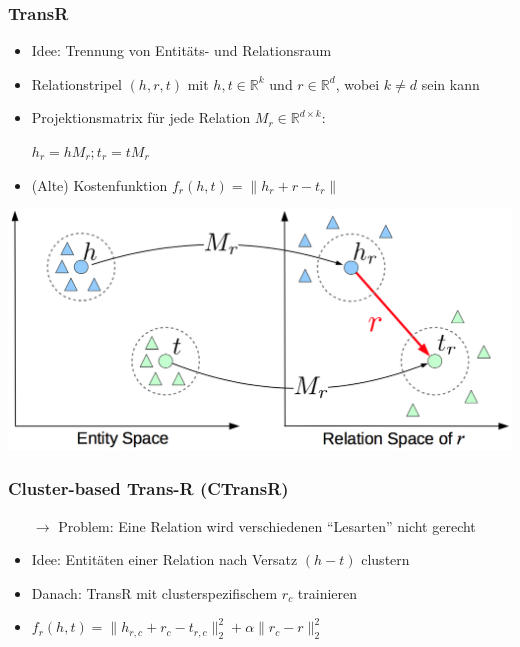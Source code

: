 \documentclass[10pt,xcolor={usenames,dvipsnames,svgnames,table}]{beamer}
\begin{document}
\begin{frame}
	\frametitle{TransR}
	\begin{itemize}
		\item Idee: Trennung von Entitäts- und Relationsraum
		\item Relationstripel $(h, r, t)$ mit $h, t \in \mathbb{R}^k$ und $r \in \mathbb{R}^d$, wobei $k \neq d$ sein kann
		\item Projektionsmatrix für jede Relation $M_r \in \mathbb{R}^{d\times k}$:
		\item[] $h_r = hM_r; t_r = tM_r$ 
		\item (Alte) Kostenfunktion $f_r(h, t) = \|h_r + r - t_r\|$
	\end{itemize}
	\begin{center}
		\includegraphics[scale=0.20]{./img/transr.png}
	\end{center}
\end{frame}

\begin{frame}
	\frametitle{Cluster-based Trans-R (CTransR)}
	\begin{itemize}
		\item[$\rightarrow$] Problem: Eine Relation wird verschiedenen ``Lesarten'' nicht gerecht
		\item Idee: Entitäten einer Relation nach Versatz $(h-t)$ clustern
		\item Danach: TransR mit clusterspezifischem $r_c$ trainieren
		\item $f_r(h, t) = \|h_{r, c} + r_c - t_{r,c}\|^2_2 + \alpha\|r_c-r\|^2_2$
	\end{itemize}
\end{frame}
\end{document}
